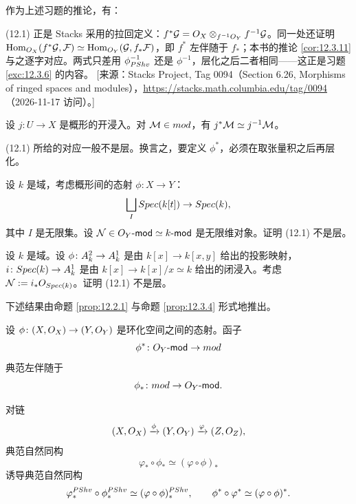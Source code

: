 作为上述习题的推论，有：

\begin{yizhu}
(12.1) 正是 Stacks 采用的拉回定义：$f^{*}\mathcal{G} = O_X\otimes_{f^{-1}O_Y}f^{-1}\mathcal{G}$。同一处还证明 $\operatorname{Hom}_{O_X}(f^{*}\mathcal{G},\mathcal{F})\simeq\operatorname{Hom}_{O_Y}(\mathcal{G},f_*\mathcal{F})$，即 $f^{*}$ 左伴随于 $f_*$；本书的推论 \ref{cor:12.3.11} 与之逐字对应。两式只差用 $\phi^{-1}_{PShv}$ 还是 $\phi^{-1}$，层化之后二者相同——这正是习题 \ref{exc:12.3.6} 的内容。
[来源：Stacks Project, Tag 0094（Section 6.26, Morphisms of ringed spaces and modules），\url{https://stacks.math.columbia.edu/tag/0094}（2026-11-17 访问）。]
\end{yizhu}

\begin{lemma}\label{lem:12.3.7}
设 $j\colon U\to X$ 是概形的开浸入。对 $\mathcal{M}\in mod$，有 $j^*\mathcal{M}\simeq j^{-1}\mathcal{M}$。
\end{lemma}

\begin{warning}\label{warn:12.3.8}
(12.1) 所给的对应一般不是层。换言之，要定义 $\phi^*$，必须在取张量积之后再层化。
\end{warning}

\begin{exercise}\label{exc:12.3.9}
设 $k$ 是域，考虑概形间的态射 $\phi\colon X\to Y$：
\[
\bigsqcup_I Spec(k[t])\to Spec(k),
\]
其中 $I$ 是无限集。设 $\mathcal{N}\in O_Y\text{-}\mathsf{mod}\simeq k\text{-}\mathsf{mod}$ 是无限维对象。证明 (12.1) 不是层。
\end{exercise}

\begin{exercise}\label{exc:12.3.10}
设 $k$ 是域。设 $\phi\colon A^2_k\to A^1_k$ 是由 $k[x]\to k[x,y]$ 给出的投影映射，$i\colon Spec(k)\to A^1_k$ 是由 $k[x]\to k[x]/x\simeq k$ 给出的闭浸入。考虑 $\mathcal{N}:=i_*O_{Spec(k)}$。证明 (12.1) 不是层。
\end{exercise}

下述结果由命题 \ref{prop:12.2.1} 与命题 \ref{prop:12.3.4} 形式地推出。

\begin{corollary}\label{cor:12.3.11}
设 $\phi\colon(X,O_X)\to(Y,O_Y)$ 是环化空间之间的态射。函子
\[
\phi^*\colon O_Y\text{-}\mathsf{mod}\to mod
\]
典范左伴随于
\[
\phi_*\colon mod\to O_Y\text{-}\mathsf{mod}.
\]
\end{corollary}

\begin{construction}\label{con:12.3.12}
对链
\[
(X,O_X)\xrightarrow{\phi}(Y,O_Y)\xrightarrow{\varphi}(Z,O_Z),
\]
典范自然同构
\[
\varphi_*\circ\phi_*\simeq(\varphi\circ\phi)_*
\]
诱导典范自然同构
\[
\varphi^{PShv}_*\circ\phi^{PShv}_*\simeq(\varphi\circ\phi)^{PShv}_*,
\qquad
\phi^*\circ\varphi^*\simeq(\varphi\circ\phi)^*.
\]
\end{construction}

